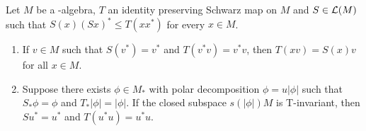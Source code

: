 \begin{lemma}\label{lem:d3-1.2}
Let $M$ be a \WA-algebra, $T$ an identity preserving Schwarz map on $M$ and $S\in\mathcal{L}(M)$ such that $S(x)(Sx)^{*} \leq T(xx^{*})$ for every $x\in M$.
\begin{enumerate}[\upshape (i)]

\item\label{item:d3-1.2-i}
If\/ $v\in M$ such that $S(v^{*}) = v^{*}$ and $T(v^{*}v) = v^{*}v$, then $T(xv) = S(x)v$ for all $x\in M$.

\item\label{item:d3-1.2-ii}
Suppose there exists $\phi\in M_{*}$ with polar decomposition $\phi = u|\phi|$ such that $S_{*}\phi = \phi$ and $T_{*}|\phi| = |\phi|$.
If the closed subspace $s(|\phi|)M$ is T-invariant, then $Su^{*} = u^{*}$ and $T(u^{*}u) = u^{*}u$.
\end{enumerate}
\end{lemma}

